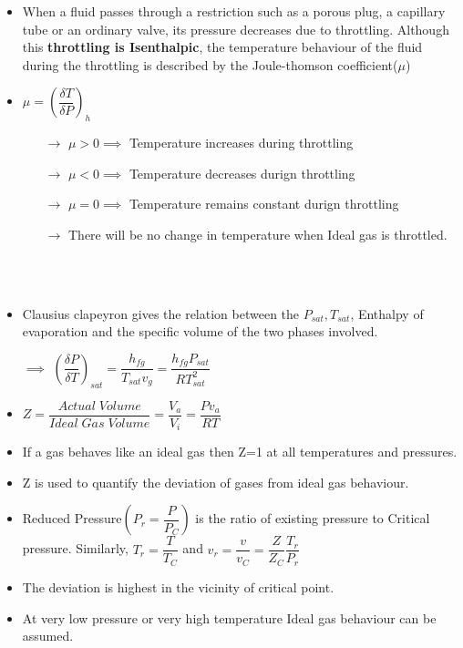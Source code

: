 \documentclass[8pt]{article}
\begin{document}
	\begin{itemize}
		\item When a fluid passes through a restriction such as a porous plug, a capillary tube or an ordinary valve, its pressure decreases due to throttling. Although this \textbf{throttling is Isenthalpic}, the temperature behaviour of the fluid during the throttling is described by the Joule-thomson coefficient($\mu$)
		\item$\boxed{\mu = \left(\dfrac{\delta T}{\delta P}\right)_h}$
			\begin{itemize}
				\item[$\rightarrow$] $\mu > 0 \implies$ Temperature increases during throttling
				\item[$\rightarrow$] $\mu < 0 \implies$ Temperature decreases durign throttling
				\item[$\rightarrow$] $\mu = 0 \implies$ Temperature remains constant durign throttling
				\item[$\rightarrow$] There will be no change in temperature when Ideal gas is throttled.
			\end{itemize}
	\end{itemize}\hrulefill\\\\
	\begin{itemize}
		\item Clausius clapeyron gives the relation between the $P_{sat}, T_{sat}$, Enthalpy of evaporation and the specific volume of the two phases involved. 
		\item[$\implies$] $\boxed{\left(\dfrac{\delta P}{\delta T}\right)_{sat} = \dfrac{h_{fg}}{T_{sat}v_g}} = \boxed{\dfrac{h_{fg}P_{sat}}{RT_{sat}^2}}$
	\end{itemize}
	\begin{itemize}
		\item $Z = \dfrac{Actual\;Volume}{Ideal\;Gas\;Volume} = \dfrac{V_a}{V_i} = \dfrac{Pv_a}{RT}$
		\item If a gas behaves like an ideal gas then Z=1 at all temperatures and pressures. 
		\item Z is used to quantify the deviation of gases from ideal gas behaviour.
		\item Reduced Pressure$(P_r = \dfrac{P}{P_C})$ is the ratio of existing pressure to Critical pressure. Similarly, $T_r = \dfrac{T}{T_C}$ and $v_r = \dfrac{v}{v_C} = \dfrac{Z}{Z_C}\dfrac{T_r}{P_r}$
		\item The deviation is highest in the vicinity of critical point. 
		\item At very low pressure or very high temperature Ideal gas behaviour can be assumed.
	\end{itemize}\hrulefill\\\\
\end{document}

